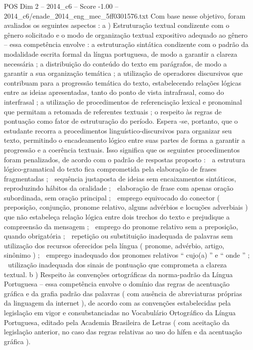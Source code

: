 \begin{textsample}{POS Dim 2 – 2014\_c6 – Score -1.00 – 2014\_c6/enade\_2014\_eng\_mec\_5ff0301576.txt}
Com base nesse objetivo, foram avaliados os seguintes aspectos : a ) Estruturação textual condizente com o gênero solicitado e o modo de organização textual expositivo adequado ao gênero – essa competência envolve : a estruturação sintática condizente com o padrão da modalidade escrita formal da língua portuguesa, de modo a garantir a clareza necessária ; a distribuição do conteúdo do texto em parágrafos, de modo a garantir a sua organização temática ; a utilização de operadores discursivos que contribuam para a progressão temática do texto, estabelecendo relações lógicas entre as ideias apresentadas, tanto do ponto de vista intrafrasal, como do interfrasal ; a utilização de procedimentos de referenciação lexical e pronominal que permitam a retomada de referentes textuais ; o respeito às regras de pontuação como fator de estruturação do período.
Espera -se, portanto, que o estudante recorra a procedimentos linguístico-discursivos para organizar seu texto, permitindo o encadeamento lógico entre suas partes de forma a garantir a progressão e a coerência textuais.
Isso significa que os seguintes procedimentos foram penalizados, de acordo com o padrão de respostas proposto :  a estrutura lógico-gramatical do texto fica comprometida pela elaboração de frases fragmentadas ;  sequência justaposta de ideias sem encaixamentos sintáticos, reproduzindo hábitos da oralidade ;  elaboração de frase com apenas oração subordinada, sem oração principal ;  emprego equivocado do conector ( preposição, conjunção, pronome relativo, alguns advérbios e locuções adverbiais ) que não estabeleça relação lógica entre dois trechos do texto e prejudique a compreensão da mensagem ;  emprego do pronome relativo sem a preposição, quando obrigatória ;  repetição ou substituição inadequada de palavras sem utilização dos recursos oferecidos pela língua ( pronome, advérbio, artigo, sinônimo ) ;  emprego inadequado dos pronomes relativos “ cujo(a) ” e “ onde ” ;  utilização inadequada dos sinais de pontuação que comprometa a clareza textual. b ) Respeito às convenções ortográficas da norma-padrão da Língua Portuguesa – essa competência envolve o domínio das regras de acentuação gráfica e da grafia padrão das palavras ( com ausência de abreviaturas próprias da linguagem da internet ), de acordo com as convenções estabelecidas pela legislação em vigor e consubstanciadas no Vocabulário Ortográfico da Língua Portuguesa, editado pela Academia Brasileira de Letras ( com aceitação da legislação anterior, no caso das regras relativas ao uso do hífen e da acentuação gráfica ).

\end{textsample}
